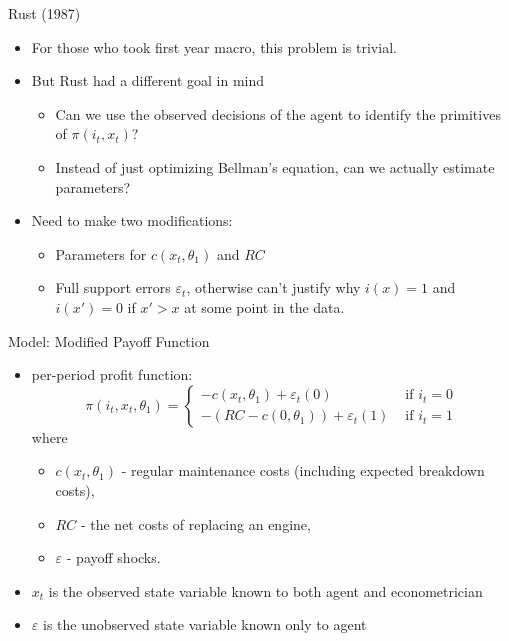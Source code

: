 \documentclass[xcolor=pdftex,dvipsnames,table,mathserif]{beamer}
\begin{document}
\begin{frame}{Rust (1987)}
\begin{itemize}
\item For those who took first year macro, this problem is trivial. 
\item But Rust had a different goal in mind
\begin{itemize}
\item Can we use the observed decisions of the agent to identify the primitives of $\pi(i_t,x_t)$?
\item Instead of just optimizing Bellman's equation, can we actually \alert{estimate parameters}?
\end{itemize}
\item Need to make two modifications: 
\begin{itemize}
\item Parameters for $c(x_t,\theta_1)$ and $RC$
\item Full support errors $\varepsilon_{t}$, otherwise can't justify why $i(x)=1$ and $i(x')=0$ if $x'>x$ at some point in the data.
\end{itemize}
\end{itemize}
\end{frame}

\begin{frame}{Model: Modified Payoff Function}
\begin{itemize}
	\item per-period profit function:\[
		\pi \left(i_{t},x_{t},\theta_{1}\right)=
		\begin{cases}
		-c\left(x_{t},\theta_{1}\right)+\varepsilon_{t}\left(0\right) & \mbox{ if }i_{t}=0\\		
		-\left(RC-c\left(0,\theta_{1}\right)\right)+\varepsilon_{t}\left(1\right) & \mbox{ if }i_{t}=1
		\end{cases}
		\]
	where \\
	\begin{itemize}
		\item $c\left(x_{t},\theta_{1}\right) $ -  regular maintenance costs (including expected breakdown costs),
		\item $RC$ - the net costs of replacing an engine,
		\item $\varepsilon$ - payoff shocks.
	\end{itemize}
	
	\item $x_{t}$ is the \alert{observed state variable} known to both agent and econometrician
	\item $\varepsilon$ is the \alert{unobserved state variable} known only to agent
\end{itemize}
\end{frame}
\end{document}
